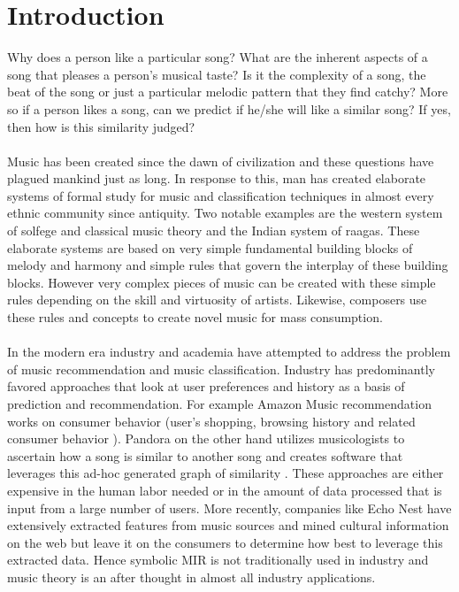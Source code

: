 \chapter{Introduction}
\label{sec:intro}

\noindent Why does a person like a particular song? What are the inherent aspects of a song that pleases a person's musical taste? Is it the complexity of a song, the beat of the song or just a particular melodic pattern that they find catchy? More so if a person likes a song, can we predict if he/she will like a similar song? If yes, then how is this similarity judged? \\\\
Music has been created since the dawn of civilization and these questions have plagued mankind just as long. In response to this, man has created elaborate systems of formal study for music and classification techniques in almost every ethnic community since antiquity. Two notable examples are the western system of solfege and classical music theory and the Indian system of raagas. These elaborate systems are based on very simple fundamental building blocks of melody and harmony and simple rules that govern the interplay of these building blocks. However very complex pieces of music can be created with these simple rules depending on the skill and virtuosity of artists. Likewise, composers use these rules and concepts to create novel music for mass consumption. \\\\
In the modern era industry and academia have attempted to address the problem of music recommendation and music classification. Industry has predominantly favored approaches that look at user preferences and history as a basis of prediction and recommendation. For example Amazon Music recommendation works on consumer behavior (user's shopping, browsing history and related consumer behavior \cite{amazonreco}). Pandora on the other hand utilizes musicologists to ascertain how a song is similar to another song and creates software that leverages this ad-hoc generated graph of similarity \cite{musicgenomepandora}. These approaches are either expensive in the human labor needed or in the amount of data processed that is input from a large number of users. More recently, companies like Echo Nest have extensively extracted features from music sources \cite{echonestfingerprint} and mined cultural information on the web but leave it on the consumers to determine how best to leverage this extracted data. Hence symbolic MIR is not traditionally used in industry and music theory is an after thought in almost all industry applications. \\\\

